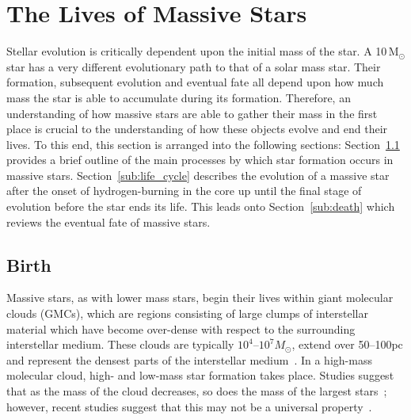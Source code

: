 \section{The Lives of Massive Stars} %
\label{sec:the_life_of_a_red_supergiant}

Stellar evolution is critically dependent upon the initial mass of the star.
A 10\,M$_{\odot}$ star has a very different evolutionary path to that of a solar mass star.
Their formation, subsequent evolution and eventual fate all depend upon how much mass the star is able to accumulate during its formation.
Therefore, an understanding of how massive stars are able to gather their mass in the first place is crucial to the understanding of how these objects evolve and end their lives.
To this end, this section is arranged into the following sections: Section~\ref{sub:birth} provides a brief outline of the main processes by which star formation occurs in massive stars.
Section~\ref{sub:life_cycle} describes the evolution of a massive star after the onset of hydrogen-burning in the core up until the final stage of evolution before the star ends its life.
This leads onto Section~\ref{sub:death} which reviews the eventual fate of massive stars.

\subsection{Birth} %
\label{sub:birth}

Massive stars, as with lower mass stars, begin their lives within giant molecular clouds (GMCs), which are regions consisting of large clumps of interstellar material which have become over-dense with respect to the surrounding interstellar medium.
These clouds are typically $10^{4}$--$10^{7}M_{\odot}$, extend over 50--100pc and represent the densest parts of the interstellar medium~\citep{Fukui10}.
In a high-mass molecular cloud, high- and low-mass star formation takes place.
Studies suggest that as the mass of the cloud decreases, so does the mass of the largest stars~\citep{Fukui10,Weidner10}; however, recent studies suggest that this may not be a universal property~\citep[e.g.][]{Bressert12}.

